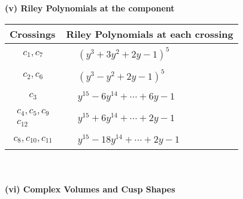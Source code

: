 \documentclass[1p]{elsarticle_modified}
\theoremstyle{definition}
\begin{document}
\newpage\renewcommand{\arraystretch}{1}
\flushleft \textbf{(v) Riley Polynomials at the component}\newline \\
\begin{tabular}{m{50pt}|m{274pt}}
Crossings & \hspace{64pt}Riley Polynomials at each crossing \\
\hline $$\begin{aligned}c_{1},c_{7}\end{aligned}$$&$\begin{aligned}
&(y^3+3 y^2+2 y-1)^5
\end{aligned}$\\
\hline $$\begin{aligned}c_{2},c_{6}\end{aligned}$$&$\begin{aligned}
&(y^3- y^2+2 y-1)^5
\end{aligned}$\\
\hline $$\begin{aligned}c_{3}\end{aligned}$$&$\begin{aligned}
&y^{15}-6 y^{14}+\cdots+6 y-1
\end{aligned}$\\
\hline $$\begin{aligned}c_{4},c_{5},c_{9}\\c_{12}\end{aligned}$$&$\begin{aligned}
&y^{15}+6 y^{14}+\cdots+2 y-1
\end{aligned}$\\
\hline $$\begin{aligned}c_{8},c_{10},c_{11}\end{aligned}$$&$\begin{aligned}
&y^{15}-18 y^{14}+\cdots+2 y-1
\end{aligned}$\\
\hline
\end{tabular}\\~\\
\newpage\flushleft \textbf{(vi) Complex Volumes and Cusp Shapes}
\end{document}
